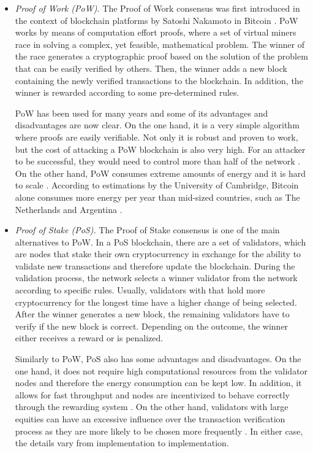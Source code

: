 \begin{itemize}
    \item \textit{Proof of Work (PoW).} The Proof of Work consensus was first introduced in the context of blockchain platforms by Satoshi Nakamoto in Bitcoin \cite{nakamoto2009bitcoin}. PoW works by means of computation effort proofs, where a set of virtual miners race in solving a complex, yet feasible, mathematical problem. The winner of the race generates a cryptographic proof based on the solution of the problem that can be easily verified by others. Then, the winner adds a new block containing the newly verified transactions to the blockchain. In addition, the winner is rewarded according to some pre-determined rules.
    
    PoW has been used for many years and some of its advantages and disadvantages are now clear. On the one hand, it is a very simple algorithm where proofs are easily verifiable. Not only it is robust and proven to work, but the cost of attacking a PoW blockchain is also very high. For an attacker to be successful, they would need to control more than half of the network \cite{li_blockchain_2021}. On the other hand, PoW consumes extreme amounts of energy and it is hard to scale \cite{edwood_2020, li_blockchain_2021}. According to estimations by the University of Cambridge, Bitcoin alone consumes more energy per year than mid-sized countries, such as The Netherlands and Argentina \cite{ccaf}.
    
    \item \textit{Proof of Stake (PoS).} The Proof of Stake consensus is one of the main alternatives to PoW. In a PoS blockchain, there are a set of validators, which are nodes that stake their own cryptocurrency in exchange for the ability to validate new transactions and therefore update the blockchain. During the validation process, the network selects a winner validator from the network according to specific rules. Usually, validators with that hold more cryptocurrency for the longest time have a higher change of being selected. After the winner generates a new block, the remaining validators have to verify if the new block is correct. Depending on the outcome, the winner either receives a reward or is penalized.
    
    Similarly to PoW, PoS also has some advantages and disadvantages. On the one hand, it does not require high computational resources from the validator nodes and therefore the energy consumption can be kept low. In addition, it allows for fast throughput and nodes are incentivized to behave correctly through the rewarding system \cite{li_blockchain_2021}. On the other hand, validators with large equities can have an excessive influence over the transaction verification process as they are more likely to be chosen more frequently \cite{li_blockchain_2021}. In either case, the details vary from implementation to implementation.
    

\end{itemize}
